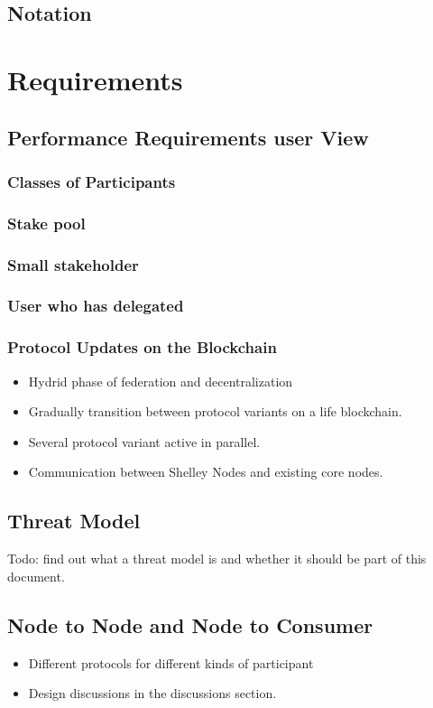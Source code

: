 \documentclass{report}
\theoremstyle{definition}{
  \newtheorem{lemma}{Lemma}[section] %
  \newtheorem{definition}[lemma]{Definition}
}
\theoremstyle{theorem}{
  \newtheorem{invariant}[lemma]{Invariant}
  \newtheorem{proofobligation}[lemma]{Proof Obligation}
}
\numberwithin{equation}{lemma}
\begin{document}
\section{Notation}

\chapter{Requirements}
\section{Performance Requirements user View}
\subsection{Classes of Participants}
\subsection{Stake pool} %
\subsection{Small stakeholder}
\subsection{User who has delegated}

\subsection{Protocol Updates on the Blockchain}
\begin{itemize}
\item Hydrid phase of federation and decentralization
\item Gradually transition between protocol variants on a life blockchain.
\item Several protocol variant active in parallel.
\item Communication between Shelley Nodes and existing core nodes.
\end{itemize}
\section{Threat Model}
Todo: find out what a threat model is and whether it should be part of this document.

\section{Node to Node and Node to Consumer}
\begin{itemize}
\item Different protocols for different kinds of participant
\item Design discussions in the discussions section.
\end{itemize}
\end{document}
